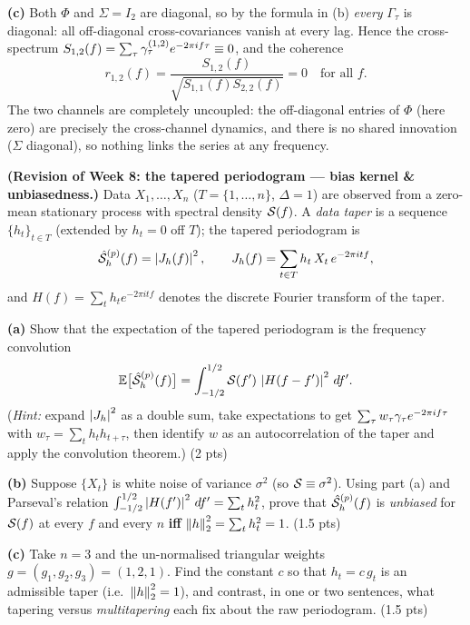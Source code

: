 \documentclass[11pt]{article}
\begin{document}
\textbf{(c)} Both $\Phi$ and $\Sigma=I_2$ are diagonal, so by the formula in (b) \emph{every} $\Gamma_\tau$ is diagonal: all off-diagonal cross-covariances vanish at every lag. Hence the cross-spectrum $S_{1,2}(f)=\sum_\tau\gamma_\tau^{(1,2)}e^{-2\pi if\tau}\equiv0$, and the coherence
\[
r_{1,2}(f)=\frac{S_{1,2}(f)}{\sqrt{S_{1,1}(f)S_{2,2}(f)}}=0\quad\text{for all }f .
\]
The two channels are completely uncoupled: the off-diagonal entries of $\Phi$ (here zero) are precisely the cross-channel dynamics, and there is no shared innovation ($\Sigma$ diagonal), so nothing links the series at any frequency.

\statementstart
\textbf{(Revision of Week 8: the tapered periodogram --- bias kernel \& unbiasedness.)} Data $X_1,\dots,X_n$ ($T=\{1,\dots,n\}$, $\Delta=1$) are observed from a zero-mean stationary process with spectral density $\mathcal{S}(f)$. A \emph{data taper} is a sequence $\{h_t\}_{t\in T}$ (extended by $h_t=0$ off $T$); the tapered periodogram is
\[
\hat{\mathcal{S}}^{(p)}_h(f)=\left\lvert J_h(f) \right\rvert^2 ,\qquad
J_h(f)=\sum_{t\in T}h_t\,X_t\,e^{-2\pi itf},
\]
and $H(f)=\sum_{t}h_t e^{-2\pi itf}$ denotes the discrete Fourier transform of the taper.

\textbf{(a)} Show that the expectation of the tapered periodogram is the frequency convolution
\[
\mathbb{E}\bigl[\hat{\mathcal{S}}^{(p)}_h(f)\bigr]=\int_{-1/2}^{1/2}\mathcal{S}(f')\,\left\lvert H(f-f') \right\rvert^2\,df' .
\]
(\emph{Hint:} expand $\left\lvert J_h \right\rvert^2$ as a double sum, take expectations to get $\sum_\tau w_\tau\gamma_\tau e^{-2\pi if\tau}$ with $w_\tau=\sum_t h_t h_{t+\tau}$, then identify $w$ as an autocorrelation of the taper and apply the convolution theorem.) \hfill(2 pts)

\textbf{(b)} Suppose $\{X_t\}$ is white noise of variance $\sigma^2$ (so $\mathcal{S}\equiv\sigma^2$). Using part (a) and Parseval's relation $\int_{-1/2}^{1/2}\left\lvert H(f') \right\rvert^2\,df'=\sum_t h_t^2$, prove that $\hat{\mathcal{S}}^{(p)}_h(f)$ is \emph{unbiased} for $\mathcal{S}(f)$ at every $f$ and every $n$ \textbf{iff} $\left\lVert h \right\rVert_2^2=\sum_t h_t^2=1$. \hfill(1.5 pts)

\textbf{(c)} Take $n=3$ and the un-normalised triangular weights $g=(g_1,g_2,g_3)=(1,2,1)$. Find the constant $c$ so that $h_t=c\,g_t$ is an admissible taper (i.e.\ $\left\lVert h \right\rVert_2^2=1$), and contrast, in one or two sentences, what tapering versus \emph{multitapering} each fix about the raw periodogram. \hfill(1.5 pts)
\statementend
\end{document}

